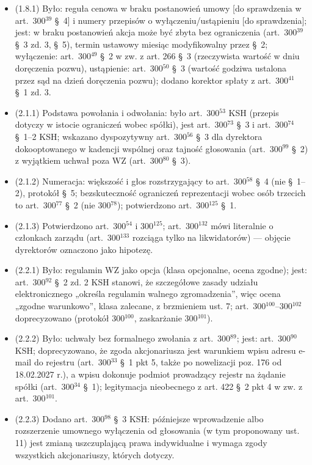 \documentclass[12pt,a4paper]{report}
\begin{document}
\begin{itemize}
  \item (1.8.1) Było: reguła cenowa w braku postanowień umowy [do sprawdzenia w art.~300$^{39}$ §~4] i numery przepisów o wyłączeniu/ustąpieniu [do sprawdzenia]; jest: w braku postanowień akcja może być zbyta bez ograniczenia (art.~300$^{39}$ §~3 zd. 3, §~5), termin ustawowy miesiąc modyfikowalny przez §~2; wyłączenie: art.~300$^{49}$ §~2 w zw. z art. 266 §~3 (rzeczywista wartość w dniu doręczenia pozwu), ustąpienie: art.~300$^{50}$ §~3 (wartość godziwa ustalona przez sąd na dzień doręczenia pozwu); dodano korektor spłaty z art.~300$^{41}$ §~1 zd. 3.
  \item (2.1.1) Podstawa powołania i odwołania: było art.~300$^{53}$ KSH (przepis dotyczy w istocie ograniczeń wobec spółki), jest art.~300$^{73}$ §~3 i art.~300$^{74}$ §~1–2 KSH; wskazano dyspozytywny art.~300$^{56}$ §~3 dla dyrektora dokooptowanego w kadencji wspólnej oraz tajność głosowania (art.~300$^{99}$ §~2) z wyjątkiem uchwał poza WZ (art.~300$^{80}$ §~3).
  \item (2.1.2) Numeracja: większość i głos rozstrzygający to art.~300$^{58}$ §~4 (nie §~1–2), protokół §~5; bezskuteczność ograniczeń reprezentacji wobec osób trzecich to art.~300$^{77}$ §~2 (nie 300$^{78}$); potwierdzono art.~300$^{125}$ §~1.
  \item (2.1.3) Potwierdzono art.~300$^{54}$ i 300$^{125}$; art.~300$^{132}$ mówi literalnie o członkach zarządu (art.~300$^{133}$ rozciąga tylko na likwidatorów) — objęcie dyrektorów oznaczono jako hipotezę.
  \item (2.2.1) Było: regulamin WZ jako opcja (klasa opcjonalne, ocena zgodne); jest: art.~300$^{92}$ §~2 zd. 2 KSH stanowi, że szczegółowe zasady udziału elektronicznego „określa regulamin walnego zgromadzenia”, więc ocena „zgodne warunkowo”, klasa zalecane, z brzmieniem ust. 7; art.~300$^{100}$–300$^{102}$ doprecyzowano (protokół 300$^{100}$, zaskarżanie 300$^{101}$).
  \item (2.2.2) Było: uchwały bez formalnego zwołania z art.~300$^{89}$; jest: art.~300$^{90}$ KSH; doprecyzowano, że zgoda akcjonariusza jest warunkiem wpisu adresu e-mail do rejestru (art.~300$^{33}$ §~1 pkt 5, także po nowelizacji poz. 176 od 18.02.2027 r.), a wpisu dokonuje podmiot prowadzący rejestr na żądanie spółki (art.~300$^{34}$ §~1); legitymacja nieobecnego z art. 422 §~2 pkt 4 w zw. z art.~300$^{101}$.
  \item (2.2.3) Dodano art.~300$^{98}$ §~3 KSH: późniejsze wprowadzenie albo rozszerzenie umownego wyłączenia od głosowania (w tym proponowany ust. 11) jest zmianą uszczuplającą prawa indywidualne i wymaga zgody wszystkich akcjonariuszy, których dotyczy.

\end{itemize}
\end{document}
